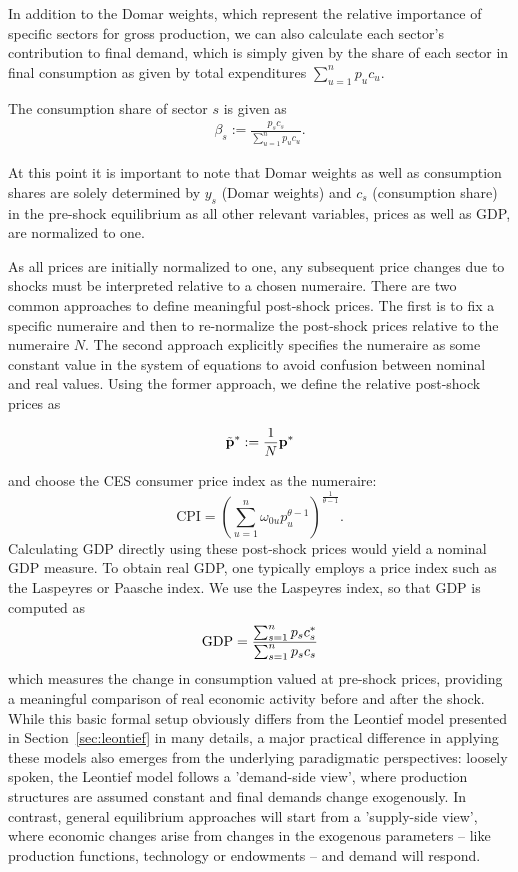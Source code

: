 In addition to the Domar weights, which represent the relative importance of specific sectors for gross production, we can also calculate each sector's contribution to final demand, which is simply given by the share of each sector in final consumption as given by total expenditures $\sum_{u=1}^n p_u c_u$.

\begin{definition}
  The consumption share of sector $s$ is given as 
  \begin{align}
    \beta_s := \frac{p_s c_s}{\sum_{u=1}^n p_u c_u}.
  \end{align}
\end{definition}

At this point it is important to note that Domar weights as well as consumption shares are solely determined by $y_s$ (Domar weights) and $c_s$ (consumption share) in the pre-shock equilibrium as all other relevant variables, prices as well as GDP, are normalized to one. 

As all prices are initially normalized to one, any subsequent price changes due to shocks must be interpreted relative to a chosen numeraire. There are two common approaches to define meaningful post-shock prices. The first is to fix a specific numeraire and then to re-normalize the post-shock prices relative to the numeraire $N$. The second approach explicitly specifies the numeraire as some constant value in the system of equations to avoid confusion between nominal and real values. Using the former approach, we define the relative post-shock prices as


\begin{align}
  \tilde {\mathbf{p}}^* := \frac{1}{N} \mathbf{p}^*
\end{align}


and choose the CES consumer price index as the numeraire:$$
\text{CPI} = \left( \sum_{u=1}^n \omega_{0u} p_u^{\theta  -1} \right)^{\frac{1}{\theta - 1}}.
$$
Calculating GDP directly using these post-shock prices would yield a nominal GDP measure. To obtain real GDP, one typically employs a price index such as the Laspeyres or Paasche index. We use the Laspeyres index, so that GDP is computed as
$$
\text{GDP} = \frac{\sum_{s=1}^n p_s c^*_s}{\sum_{s=1}^n p_s  c_s}
$$
which measures the change in consumption valued at pre-shock prices, providing a meaningful comparison of real economic activity before and after the shock.
While this basic formal setup obviously differs from the Leontief model presented in Section~\ref{sec:leontief} in many details,
a major practical difference in applying these models also emerges from the underlying paradigmatic perspectives:
loosely spoken, the Leontief model follows a 'demand-side view', where production structures are assumed constant and final demands change exogenously. In contrast, general equilibrium approaches will start from a 'supply-side view', where economic changes arise from changes in the exogenous parameters -- like production functions, technology or endowments -- and demand will respond.   

